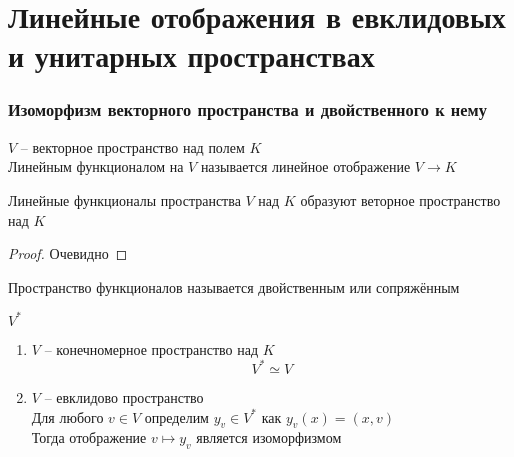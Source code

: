\part{Линейные отображения в евклидовых и унитарных пространствах}

\section{Изоморфизм векторного пространства и двойственного к не\hyph{}му}

\begin{definition}
	$ V $ -- векторное пространство над полем $ K $ \\
	Линейным функционалом на $ V $ называется линейное отображение $ V \to K $
\end{definition}

\begin{property}
	Линейные функционалы пространства $ V $ над $ K $ образуют веторное пространство над $ K $
\end{property}

\begin{proof}
	Очевидно
\end{proof}

\begin{definition}
	Пространство функционалов называется двойственным или сопряжённым
\end{definition}

\begin{notation}
	$ V^* $
\end{notation}

\begin{theorem}
	\hfill
	\begin{enumerate}
		\item $ V $ -- конечномерное пространство над $ K $
		$$ V^* \simeq V $$

		\item $ V $ -- евклидово пространство \\
		Для любого $ v \in V $ определим $ y_v \in V^* $ как $ y_v(x) = (x, v) $ \\
		Тогда отображение $ v \mapsto y_v $ является изоморфизмом
	\end{enumerate}
\end{theorem}

